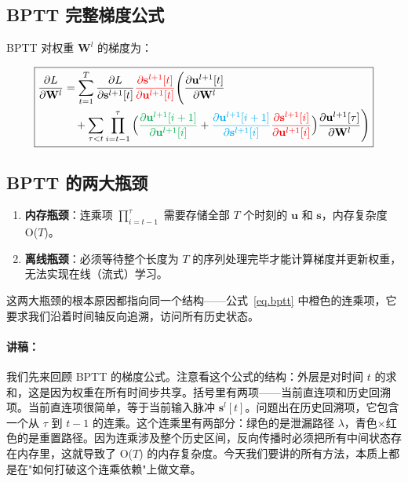 \documentclass[journal,12pt,onecolumn]{IEEEtran}
\begin{document}
\subsection*{BPTT 完整梯度公式}

BPTT 对权重 $\mathbf{W}^l$ 的梯度为：

\begin{equation}
\boxed{
\begin{aligned}
\frac{\partial L}{\partial \mathbf{W}^l}
&=
\sum_{t=1}^T
\frac{\partial L}{\partial \mathbf{s}^{l+1}[t]}
{\color{red}{\frac{\partial \mathbf{s}^{l+1}[t]}{\partial \mathbf{u}^{l+1}[t]}}}
\Bigg(
\frac{\partial \mathbf{u}^{l+1}[t]}{\partial \mathbf{W}^l}
\\
&\quad +
\sum_{\tau < t}
\prod_{i=t-1}^{\tau}
\Big(
{\color[rgb]{0,0.69,0.31}{\frac{\partial \mathbf{u}^{l+1}[i+1]}{\partial \mathbf{u}^{l+1}[i]}}}
+
{\color{cyan}{\frac{\partial \mathbf{u}^{l+1}[i+1]}{\partial \mathbf{s}^{l+1}[i]}}}
{\color{red}{\frac{\partial \mathbf{s}^{l+1}[i]}{\partial \mathbf{u}^{l+1}[i]}}}
\Big)
\frac{\partial \mathbf{u}^{l+1}[\tau]}{\partial \mathbf{W}^l}
\Bigg)
\end{aligned}
}
\label{eq.bptt}
\end{equation}

\subsection*{BPTT 的两大瓶颈}

\begin{enumerate}
    \item \textbf{内存瓶颈}：连乘项 $\prod_{i=t-1}^{\tau}$ 需要存储全部 $T$ 个时刻的 $\mathbf{u}$ 和 $\mathbf{s}$，内存复杂度 O($T$)。
    \item \textbf{离线瓶颈}：必须等待整个长度为 $T$ 的序列处理完毕才能计算梯度并更新权重，无法实现在线（流式）学习。
\end{enumerate}

这两大瓶颈的根本原因都指向同一个结构——公式~\eqref{eq.bptt} 中橙色的连乘项，它要求我们沿着时间轴反向追溯，访问所有历史状态。

\paragraph{讲稿：}
我们先来回顾 BPTT 的梯度公式。注意看这个公式的结构：外层是对时间 $t$ 的求和，这是因为权重在所有时间步共享。括号里有两项——当前直连项和历史回溯项。当前直连项很简单，等于当前输入脉冲 $\mathbf{s}^{l}[t]$。问题出在历史回溯项，它包含一个从 $\tau$ 到 $t-1$ 的连乘。这个连乘里有两部分：绿色的是泄漏路径 $\lambda$，青色×红色的是重置路径。因为连乘涉及整个历史区间，反向传播时必须把所有中间状态存在内存里，这就导致了 O($T$) 的内存复杂度。今天我们要讲的所有方法，本质上都是在"如何打破这个连乘依赖"上做文章。
\end{document}
